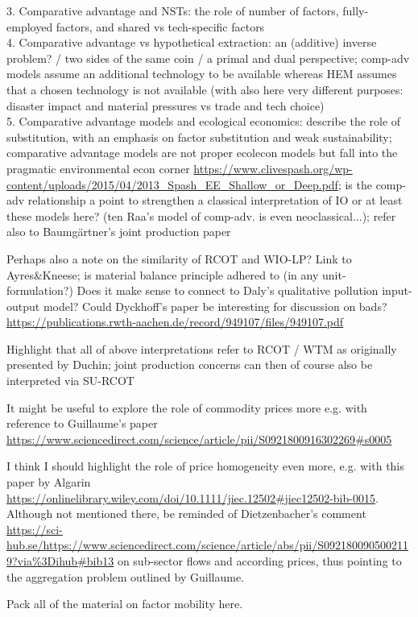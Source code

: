 3. Comparative advantage and NSTs: the role of number of factors, fully-employed factors, and shared vs tech-specific factors \\
4. Comparative advantage vs hypothetical extraction: an (additive) inverse problem? / two sides of the same coin / a primal and dual perspective; comp-adv models assume an additional technology to be available whereas HEM assumes that a chosen technology is not available (with also here very different purposes: disaster impact and material pressures vs trade and tech choice) \\
5. Comparative advantage models and ecological economics: describe the role of substitution, with an emphasis on factor substitution and weak sustainability; comparative advantage models are not proper ecolecon models but fall into the pragmatic environmental econ corner \url{https://www.clivespash.org/wp-content/uploads/2015/04/2013_Spash_EE_Shallow_or_Deep.pdf}; is the comp-adv relationship a point to strengthen a classical interpretation of IO or at least these models here? (ten Raa's model of comp-adv. is even neoclassical...); refer also to Baumgärtner's joint production paper

Perhaps also a note on the similarity of RCOT and WIO-LP?
Link to Ayres\&Kneese; is material balance principle adhered to (in any unit-formulation?)
Does it make sense to connect to Daly's qualitative pollution input-output model?
Could Dyckhoff's paper be interesting for discussion on bads? \url{https://publications.rwth-aachen.de/record/949107/files/949107.pdf}

Highlight that all of above interpretations refer to RCOT / WTM as originally presented by Duchin; joint production concerns can then of course also be interpreted via SU-RCOT

It might be useful to explore the role of commodity prices more e.g. with reference to Guillaume's paper \url{https://www.sciencedirect.com/science/article/pii/S0921800916302269#s0005}

I think I should highlight the role of price homogeneity even more, e.g. with this paper by Algarin \url{https://onlinelibrary.wiley.com/doi/10.1111/jiec.12502#jiec12502-bib-0015}. Although not mentioned there, be reminded of Dietzenbacher's comment \url{https://sci-hub.se/https://www.sciencedirect.com/science/article/abs/pii/S0921800905002119?via%3Dihub#bib13} on sub-sector flows and according prices, thus pointing to the aggregation problem outlined by Guillaume.

Pack all of the material on factor mobility here.

